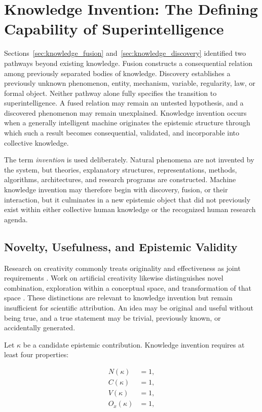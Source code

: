 \section{\textbf{Knowledge Invention: The Defining Capability of Superintelligence}}
\label{sec:knowledge_invention}

Sections~\ref{sec:knowledge_fusion} and~\ref{sec:knowledge_discovery}
identified two pathways beyond existing knowledge. Fusion constructs a
consequential relation among previously separated bodies of knowledge.
Discovery establishes a previously unknown phenomenon, entity, mechanism,
variable, regularity, law, or formal object. Neither pathway alone fully
specifies the transition to superintelligence. A fused relation may remain an
untested hypothesis, and a discovered phenomenon may remain unexplained.
Knowledge invention occurs when a generally intelligent machine originates the
epistemic structure through which such a result becomes consequential,
validated, and incorporable into collective knowledge.

The term \emph{invention} is used deliberately. Natural phenomena are not
invented by the system, but theories, explanatory structures, representations,
methods, algorithms, architectures, and research programs are constructed.
Machine knowledge invention may therefore begin with discovery, fusion, or
their interaction, but it culminates in a new epistemic object that did not
previously exist within either collective human knowledge or the recognized
human research agenda.

\subsection{\textbf{Novelty, Usefulness, and Epistemic Validity}}

Research on creativity commonly treats originality and effectiveness as joint
requirements \cite{runco2012creativity}. Work on artificial creativity likewise
distinguishes novel combination, exploration within a conceptual space, and
transformation of that space \cite{boden1998creativity}. These distinctions are
relevant to knowledge invention but remain insufficient for scientific
attribution. An idea may be original and useful without being true, and a true
statement may be trivial, previously known, or accidentally generated.

Let $\kappa$ be a candidate epistemic contribution. Knowledge invention
requires at least four properties:

\begin{equation}
\begin{aligned}
N(\kappa)&=1,\\
C(\kappa)&=1,\\
V(\kappa)&=1,\\
O_x(\kappa)&=1,
\end{aligned}
\label{eq:invention_properties}
\end{equation}

